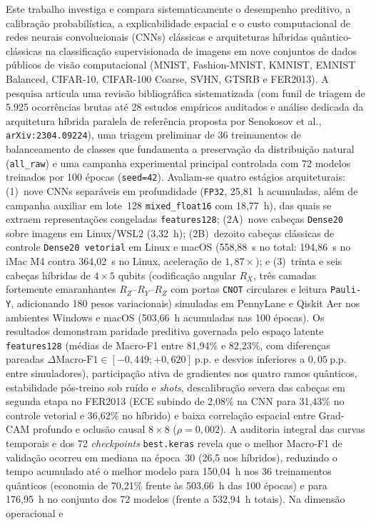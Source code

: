 \documentclass[
    12pt,
    openright,
    oneside,
    a4paper,
    english,
    brazil
]{abntex2}
\begin{document}
\frenchspacing

\pretextual
\imprimircapa
\imprimirfolhaderosto

\begin{resumo}
Este trabalho investiga e compara sistematicamente o desempenho preditivo, a calibração probabilística, a explicabilidade espacial e o custo computacional de redes neurais convolucionais (CNNs) clássicas e arquiteturas híbridas quântico-clássicas na classificação supervisionada de imagens em nove conjuntos de dados públicos de visão computacional (MNIST, Fashion-MNIST, KMNIST, EMNIST Balanced, CIFAR-10, CIFAR-100 Coarse, SVHN, GTSRB e FER2013). A pesquisa articula uma revisão bibliográfica sistematizada (com funil de triagem de 5.925 ocorrências brutas até 28 estudos empíricos auditados e análise dedicada da arquitetura híbrida paralela de referência proposta por Senokosov et al., \texttt{arXiv:2304.09224}), uma triagem preliminar de 36 treinamentos de balanceamento de classes que fundamenta a preservação da distribuição natural (\texttt{all\_raw}) e uma campanha experimental principal controlada com 72 modelos treinados por 100 épocas (\texttt{seed=42}). Avaliam-se quatro estágios arquiteturais: (1)~nove CNNs separáveis em profundidade (\texttt{FP32}, 25,81~h acumuladas, além de campanha auxiliar em lote~128 \texttt{mixed\_float16} com 18,77~h), das quais se extraem representações congeladas \texttt{features128}; (2A)~nove cabeças \texttt{Dense20} sobre imagens em Linux/WSL2 (3,32~h); (2B)~dezoito cabeças clássicas de controle \texttt{Dense20 vetorial} em Linux e macOS (558,88~s no total: 194,86~s no iMac M4 contra 364,02~s no Linux, aceleração de \(1{,}87\times\)); e (3)~trinta e seis cabeças híbridas de \(4 \times 5\) qubits (codificação angular \(R_X\), três camadas fortemente emaranhantes \(R_Z\text{--}R_Y\text{--}R_Z\) com portas \texttt{CNOT} circulares e leitura \texttt{Pauli-Y}, adicionando 180 pesos variacionais) simuladas em PennyLane e Qiskit Aer nos ambientes Windows e macOS (503,66~h acumuladas nas 100 épocas). Os resultados demonstram paridade preditiva governada pelo espaço latente \texttt{features128} (médias de Macro-F1 entre 81,94\% e 82,23\%, com diferenças pareadas \(\Delta\text{Macro-F1} \in [-0{,}449; +0{,}620]~\text{p.p.}\) e desvios inferiores a \(0{,}05~\text{p.p.}\) entre simuladores), participação ativa de gradientes nos quatro ramos quânticos, estabilidade pós-treino sob ruído e \textit{shots}, descalibração severa das cabeças em segunda etapa no FER2013 (ECE subindo de 2,08\% na CNN para 31,43\% no controle vetorial e 36,62\% no híbrido) e baixa correlação espacial entre Grad-CAM profundo e oclusão causal \(8 \times 8\) (\(\rho = 0{,}002\)). A auditoria integral das curvas temporais e dos 72 \textit{checkpoints} \texttt{best.keras} revela que o melhor Macro-F1 de validação ocorreu em mediana na época~30 (26,5 nos híbridos), reduzindo o tempo acumulado até o melhor modelo para 150,04~h nos 36 treinamentos quânticos (economia de 70,21\% frente às 503,66~h das 100 épocas) e para 176,95~h no conjunto dos 72 modelos (frente a 532,94~h totais). Na dimensão operacional e 
\end{resumo}
\end{document}
